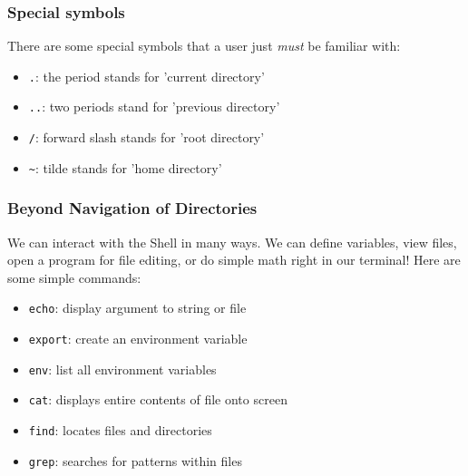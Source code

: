 \documentclass{if-beamer}
\begin{document}
\begin{frame}
\frametitle{Special symbols}
There are some special symbols that a user just \textit{must} be
familiar with:
\begin{itemize}
\item \texttt{.}: the period stands for 'current directory'
\item \texttt{..}: two periods stand for 'previous directory'
\item \texttt{/}: forward slash stands for 'root directory'
\item \texttt{\textasciitilde}: tilde stands for 'home directory'
\end{itemize}
\end{frame}

\begin{frame}
\frametitle{Beyond Navigation of Directories}
We can interact with the Shell in many ways. We can define variables,
view files, open a program for file editing, or do simple math right in
our terminal! Here are some simple commands:
\begin{itemize}
\item \texttt{echo}: display argument to string or file
\item \texttt{export}: create an environment variable
\item \texttt{env}: list all environment variables
\item \texttt{cat}: displays entire contents of file onto screen
\item \texttt{find}: locates files and directories
\item \texttt{grep}: searches for patterns within files
\end{itemize}
\end{frame}
\end{document}
